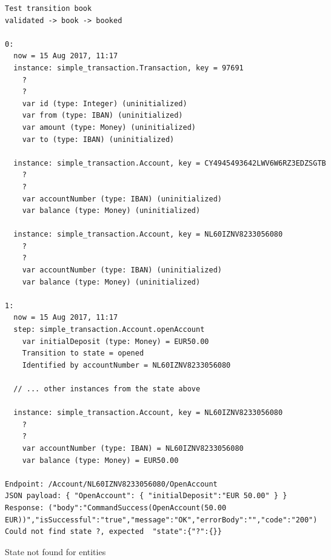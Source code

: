 \begin{sourcecode}[h!]
\begin{lstlisting}[]
Test transition book
validated -> book -> booked

0:
  now = 15 Aug 2017, 11:17
  instance: simple_transaction.Transaction, key = 97691
    ?
    ?
    var id (type: Integer) (uninitialized)
    var from (type: IBAN) (uninitialized)
    var amount (type: Money) (uninitialized)
    var to (type: IBAN) (uninitialized)

  instance: simple_transaction.Account, key = CY4945493642LWV6W6RZ3EDZSGTB
    ?
    ?
    var accountNumber (type: IBAN) (uninitialized)
    var balance (type: Money) (uninitialized)

  instance: simple_transaction.Account, key = NL60IZNV8233056080
    ?
    ?
    var accountNumber (type: IBAN) (uninitialized)
    var balance (type: Money) (uninitialized)

1:
  now = 15 Aug 2017, 11:17
  step: simple_transaction.Account.openAccount
    var initialDeposit (type: Money) = EUR50.00
    Transition to state = opened
    Identified by accountNumber = NL60IZNV8233056080

  // ... other instances from the state above

  instance: simple_transaction.Account, key = NL60IZNV8233056080
    ?
    ?
    var accountNumber (type: IBAN) = NL60IZNV8233056080
    var balance (type: Money) = EUR50.00

Endpoint: /Account/NL60IZNV8233056080/OpenAccount
JSON payload: { "OpenAccount": { "initialDeposit":"EUR 50.00" } }
Response: ("body":"CommandSuccess(OpenAccount(50.00 EUR))","isSuccessful":"true","message":"OK","errorBody":"","code":"200")
Could not find state ?, expected  "state":{"?":{}}
\end{lstlisting}
\caption{State not found for entities}
\label{fig:result-not-found-state}
\end{sourcecode}


